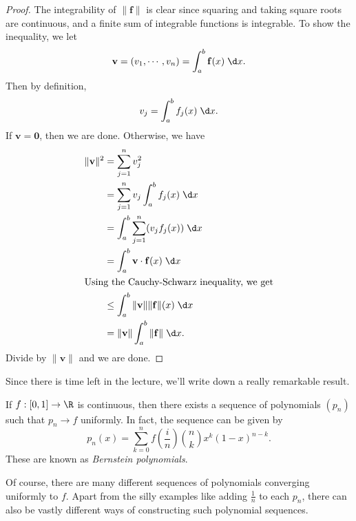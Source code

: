 \documentclass[a4paper]{article}
\begin{document}
\begin{proof}
  The integrability of $\|\mathbf{f}\|$ is clear since squaring and taking square roots are continuous, and a finite sum of integrable functions is integrable. To show the inequality, we let
  \[
    \mathbf{v} = (v_1, \cdots, v_n) = \int_a^b \mathbf{f}(x)\;\d x.
  \]
  Then by definition,
  \[
    v_j = \int_a^b f_j(x)\;\d x.
  \]
  If $\mathbf{v} = \mathbf{0}$, then we are done. Otherwise, we have
  \begin{align*}
    \|\mathbf{v}\|^2 &= \sum_{j = 1}^n v_j^2 \\
    &= \sum_{j = 1}^n v_j \int_a^b f_j(x)\;\d x \\
    &= \int_a^b \sum_{j = 1}^n (v_j f_j(x))\;\d x\\
    &= \int_a^b \mathbf{v}\cdot \mathbf{f}(x)\;\d x\\
    \intertext{Using the Cauchy-Schwarz inequality, we get}
    &\leq \int_a^b \|\mathbf{v}\| \|\mathbf{f}\|(x)\;\d x\\
    &= \|\mathbf{v}\|\int_a^b \|\mathbf{f}\|\;\d x.
  \end{align*}
  Divide by $\|\mathbf{v}\|$ and we are done.
\end{proof}
Since there is time left in the lecture, we'll write down a really remarkable result.
\begin{thm}
  If $f: [0, 1] \to \R$ is continuous, then there exists a sequence of polynomials $(p_n)$ such that $p_n \to f$ uniformly. In fact, the sequence can be given by
  \[
    p_n(x) = \sum_{k = 0}^n f\left(\frac{i}{n}\right) \binom{n}{k} x^k(1 - x)^{n - k}.
  \]
  These are known as \emph{Bernstein polynomials}.
\end{thm}
Of course, there are many different sequences of polynomials converging uniformly to $f$. Apart from the silly examples like adding $\frac{1}{n}$ to each $p_n$, there can also be vastly different ways of constructing such polynomial sequences.
\end{document}
